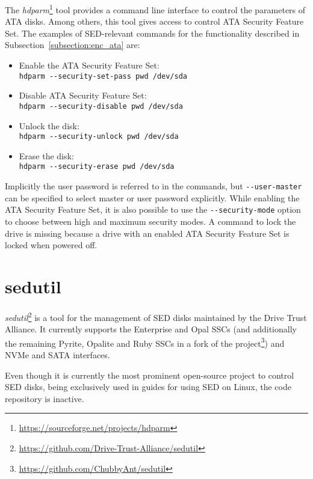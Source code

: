 The \emph{hdparm}\footnote{\url{https://sourceforge.net/projects/hdparm}} tool provides a command line interface to control the parameters of ATA disks. Among others, this tool gives access to control ATA Security Feature Set.
The examples of SED-relevant commands for the functionality described in Subsection~\ref{subsection:enc_ata} are:
\begin{itemize}
\item Enable the ATA Security Feature Set:\\ \verb|hdparm --security-set-pass pwd /dev/sda|
\item Disable ATA Security Feature Set:\\ \verb|hdparm --security-disable pwd /dev/sda|
\item Unlock the disk:\\ \verb|hdparm --security-unlock pwd /dev/sda|
\item Erase the disk:\\ \verb|hdparm --security-erase pwd /dev/sda|
\end{itemize}
Implicitly the user password is referred to in the commands, but \verb|--user-master| can be specified to select master or user password explicitly. While enabling the ATA Security Feature Set, it is also possible to use the \verb|--security-mode| option to choose between high and maximum security modes.
A command to lock the drive is missing because a drive with an enabled ATA Security Feature Set is locked when powered off.


\section{sedutil}

\emph{sedutil}\footnote{\url{https://github.com/Drive-Trust-Alliance/sedutil}} is a tool for the management of SED disks maintained by the Drive Trust Alliance.
It currently supports the Enterprise and Opal SSCs (and additionally the remaining Pyrite, Opalite and Ruby SSCs in a fork of the project\footnote{\url{https://github.com/ChubbyAnt/sedutil}}) and NVMe and SATA interfaces.

Even though it is currently the most prominent open-source project to control SED disks, being exclusively used in guides for using SED on Linux, the code repository is inactive.



